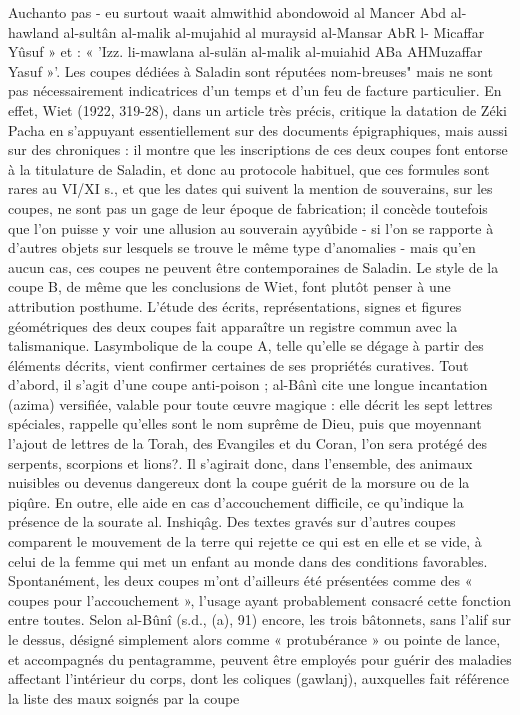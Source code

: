 Auchanto pas - eu surtout
waait almwithid abondowoid al Mancer Abd al-
hawland al-sultân al-malik al-mujahid al muraysid al-Mansar AbR l-
Micaffar Yûsuf » et : « 'Izz. li-mawlana al-sulän al-malik al-muiahid ABa
AHMuzaffar Yasuf »'. Les coupes dédiées à Saladin sont réputées nom-breuses" mais ne sont pas nécessairement indicatrices d'un temps et d'un feu de facture particulier. En effet, Wiet (1922, 319-28), dans un article très précis, critique la datation de Zéki Pacha en s'appuyant essentiellement sur des documents épigraphiques, mais aussi sur des chroniques : il montre que les inscriptions de ces deux coupes font entorse à la titulature de Saladin, et donc au protocole habituel, que ces formules sont rares au VI/XI s., et que les dates qui suivent la mention de souverains, sur les coupes, ne sont pas un gage de leur époque de fabrication; il concède toutefois que l'on puisse y voir une allusion au souverain ayyûbide - si l'on se rapporte à d'autres objets sur lesquels se trouve le même type d'anomalies - mais qu'en aucun cas, ces coupes ne peuvent être contemporaines de Saladin. Le style de la coupe B, de même que les conclusions de Wiet, font plutôt penser à une attribution posthume.
L'étude des écrits, représentations, signes et figures géométriques des deux coupes fait apparaître un registre commun avec la talismanique. Lasymbolique de la coupe A, telle qu'elle se dégage à partir des éléments décrits, vient confirmer certaines de ses propriétés curatives. Tout d'abord, il s'agit d'une coupe anti-poison ; al-Bânì cite une longue incantation (azima) versifiée, valable pour toute œuvre magique : elle décrit les sept lettres spéciales, rappelle qu'elles sont le nom suprême de Dieu, puis que moyennant l'ajout de lettres de la Torah, des Evangiles et du Coran, l'on sera protégé des serpents, scorpions et lions?. Il s'agirait donc, dans l'ensemble, des animaux nuisibles ou devenus dangereux dont la coupe guérit de la morsure ou de la piqûre. En outre, elle aide en cas d'accouchement difficile, ce qu'indique la présence de la sourate al.
Inshiqâg. Des textes gravés sur d'autres coupes comparent le mouvement de la terre qui rejette ce qui est en elle et se vide, à celui de la femme qui met un enfant au monde dans des conditions favorables. Spontanément, les deux coupes m'ont d'ailleurs été présentées comme des « coupes pour l'accouchement », l'usage ayant probablement consacré cette fonction entre toutes. Selon al-Bûnî (s.d., (a), 91) encore, les trois bâtonnets, sans l'alif sur le dessus, désigné simplement alors comme « protubérance » ou pointe de lance, et accompagnés du pentagramme, peuvent être employés pour guérir des maladies affectant l'intérieur du corps, dont les coliques (gawlanj), auxquelles fait référence la liste des maux soignés par la coupe
